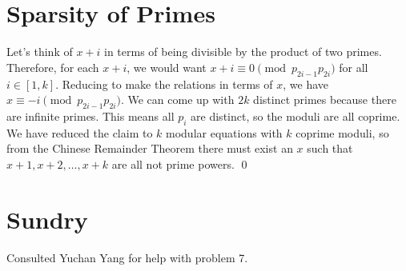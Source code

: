 \documentclass{article}
\begin{document}
	\newpage
	\section{Sparsity of Primes}
	Let's think of $x+i$ in terms of being divisible by the product of two primes. Therefore, for each 
	$x+i$, we would want $x+i \equiv 0 \pmod{p_{2i-1}p_{2i}}$ for all $i \in [1, k]$. Reducing to make the
	relations in terms of $x$, we have $x \equiv -i \pmod{p_{2i-1}p_{2i}}$. 
	We can come up with $2k$ distinct primes because there are infinite primes. 
	This means all $p_i$ are distinct, so the moduli are all coprime. 
	We have reduced the claim to $k$ modular equations with $k$ coprime moduli, so from the Chinese 
	Remainder Theorem there must exist an $x$ such that $x+1, x+2, \ldots, x+k$ are all not prime
	powers. \qed
	
	\newpage
	\section{Sundry}
	Consulted Yuchan Yang for help with problem 7.
\end{document}
